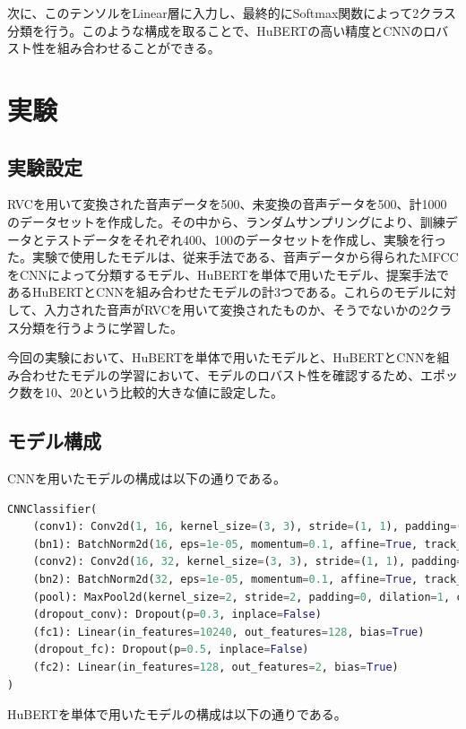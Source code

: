 \documentclass[10pt]{ltjsarticle}
\begin{document}
次に、このテンソルをLinear層に入力し、最終的にSoftmax関数によって2クラス分類を行う。このような構成を取ることで、HuBERTの高い精度とCNNのロバスト性を組み合わせることができる。

\section{実験}

\subsection{実験設定}

RVCを用いて変換された音声データを500、未変換の音声データを500、計1000のデータセットを作成した。その中から、ランダムサンプリングにより、訓練データとテストデータをそれぞれ400、100のデータセットを作成し、実験を行った。実験で使用したモデルは、従来手法である、音声データから得られたMFCCをCNNによって分類するモデル、HuBERTを単体で用いたモデル、提案手法であるHuBERTとCNNを組み合わせたモデルの計3つである。これらのモデルに対して、入力された音声がRVCを用いて変換されたものか、そうでないかの2クラス分類を行うように学習した。

今回の実験において、HuBERTを単体で用いたモデルと、HuBERTとCNNを組み合わせたモデルの学習において、モデルのロバスト性を確認するため、エポック数を10、20という比較的大きな値に設定した。
\subsection{モデル構成}

CNNを用いたモデルの構成は以下の通りである。
\begin{lstlisting}[language=Python]
CNNClassifier(
    (conv1): Conv2d(1, 16, kernel_size=(3, 3), stride=(1, 1), padding=(1, 1))
    (bn1): BatchNorm2d(16, eps=1e-05, momentum=0.1, affine=True, track_running_stats=True)
    (conv2): Conv2d(16, 32, kernel_size=(3, 3), stride=(1, 1), padding=(1, 1))
    (bn2): BatchNorm2d(32, eps=1e-05, momentum=0.1, affine=True, track_running_stats=True)
    (pool): MaxPool2d(kernel_size=2, stride=2, padding=0, dilation=1, ceil_mode=False)
    (dropout_conv): Dropout(p=0.3, inplace=False)
    (fc1): Linear(in_features=10240, out_features=128, bias=True)
    (dropout_fc): Dropout(p=0.5, inplace=False)
    (fc2): Linear(in_features=128, out_features=2, bias=True)
)
\end{lstlisting}

HuBERTを単体で用いたモデルの構成は以下の通りである。
\end{document}
